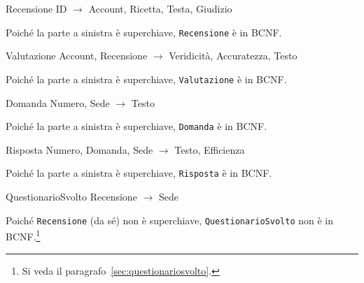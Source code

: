 \begin{samepage}
\begin{funcdep}{Recensione}
    ID $\to$ Account, Ricetta, Testa, Giudizio
\end{funcdep}
Poiché la parte a sinistra è superchiave, {\tt Recensione} è in BCNF.
\end{samepage}

\begin{samepage}
\begin{funcdep}{Valutazione}
    Account, Recensione $\to$ Veridicità, Accuratezza, Testo
\end{funcdep}
Poiché la parte a sinistra è superchiave, {\tt Valutazione} è in BCNF.
\end{samepage}

\begin{samepage}
\begin{funcdep}{Domanda}
    Numero, Sede $\to$ Testo
\end{funcdep}
Poiché la parte a sinistra è superchiave, {\tt Domanda} è in BCNF.
\end{samepage}

\begin{samepage}
\begin{funcdep}{Risposta}
    Numero, Domanda, Sede $\to$ Testo, Efficienza
\end{funcdep}
Poiché la parte a sinistra è superchiave, {\tt Risposta} è in BCNF.
\end{samepage}

\begin{samepage}
\begin{funcdep}{QuestionarioSvolto}
    Recensione $\to$ Sede
\end{funcdep}
Poiché {\tt Recensione} (da sé) non è superchiave, {\tt QuestionarioSvolto} non è in BCNF.\footnote{Si veda il paragrafo~\vref{sec:questionariosvolto}.}
\end{samepage}
